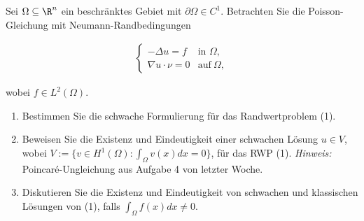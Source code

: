 
\begin{exercise}

Sei $\Omega \subseteq \R^n$ ein beschränktes Gebiet mit $\partial\Omega \in C^1$.
Betrachten Sie die Poisson-Gleichung mit Neumann-Randbedingungen

\begin{align}
    \begin{cases}
    -\Delta u = f & \text{in } \Omega, \\
    \nabla u \cdot \nu = 0 & \text{auf}~ \Omega,
    \end{cases}
    \label{neumann}
\end{align}

wobei $f \in L^2(\Omega)$.

\begin{enumerate}[label = \alph*)]

    \item Bestimmen Sie die schwache Formulierung für das Randwertproblem (1).

    \item Beweisen Sie die Existenz und Eindeutigkeit einer schwachen Lösung $u \in V$, wobei $V := \{v \in H^1(\Omega): \int_\Omega v(x)dx = 0\}$, für das RWP (1).
    \textit{Hinweis:}
    Poincaré-Ungleichung aus Aufgabe 4 von letzter Woche.

    \item Diskutieren Sie die Existenz und Eindeutigkeit von schwachen und klassischen Lösungen von (1), falls $\int_\Omega f(x)dx \neq 0$.

\end{enumerate}

\end{exercise}


